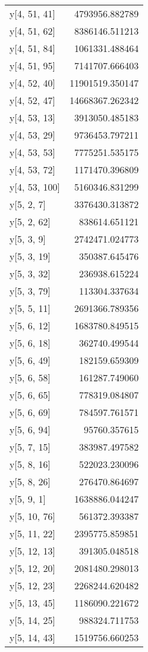 \begin{longtable}{lr}
y[4, 51, 41] & 4793956.882789 \\
y[4, 51, 62] & 8386146.511213 \\
y[4, 51, 84] & 1061331.488464 \\
y[4, 51, 95] & 7141707.666403 \\
y[4, 52, 40] & 11901519.350147 \\
y[4, 52, 47] & 14668367.262342 \\
y[4, 53, 13] & 3913050.485183 \\
y[4, 53, 29] & 9736453.797211 \\
y[4, 53, 53] & 7775251.535175 \\
y[4, 53, 72] & 1171470.396809 \\
y[4, 53, 100] & 5160346.831299 \\
y[5, 2, 7] & 3376430.313872 \\
y[5, 2, 62] & 838614.651121 \\
y[5, 3, 9] & 2742471.024773 \\
y[5, 3, 19] & 350387.645476 \\
y[5, 3, 32] & 236938.615224 \\
y[5, 3, 79] & 113304.337634 \\
y[5, 5, 11] & 2691366.789356 \\
y[5, 6, 12] & 1683780.849515 \\
y[5, 6, 18] & 362740.499544 \\
y[5, 6, 49] & 182159.659309 \\
y[5, 6, 58] & 161287.749060 \\
y[5, 6, 65] & 778319.084807 \\
y[5, 6, 69] & 784597.761571 \\
y[5, 6, 94] & 95760.357615 \\
y[5, 7, 15] & 383987.497582 \\
y[5, 8, 16] & 522023.230096 \\
y[5, 8, 26] & 276470.864697 \\
y[5, 9, 1] & 1638886.044247 \\
y[5, 10, 76] & 561372.393387 \\
y[5, 11, 22] & 2395775.859851 \\
y[5, 12, 13] & 391305.048518 \\
y[5, 12, 20] & 2081480.298013 \\
y[5, 12, 23] & 2268244.620482 \\
y[5, 13, 45] & 1186090.221672 \\
y[5, 14, 25] & 988324.711753 \\
y[5, 14, 43] & 1519756.660253 \\

\end{longtable}
